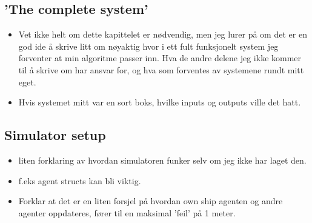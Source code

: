 \subsection{'The complete system'}
\begin{itemize}
    \item Vet ikke helt om dette kapittelet er nødvendig, men jeg lurer på om det er en god ide å skrive litt om nøyaktig hvor i ett fult funksjonelt
    system jeg forventer at min algoritme passer inn. Hva de andre delene jeg ikke kommer til å skrive om har ansvar for, og hva som forventes av systemene
    rundt mitt eget.
    \item Hvis systemet mitt var en sort boks, hvilke inputs og outputs ville det hatt.
\end{itemize}

\subsection{Simulator setup}
\begin{itemize}
    \item liten forklaring av hvordan simulatoren funker selv om jeg ikke har laget den.
    \item f.eks agent structs kan bli viktig.
    \item Forklar at det er en liten forsjel på hvordan own ship agenten og andre agenter oppdateres, fører til en maksimal 'feil' på 1 meter.
\end{itemize}



\newpage